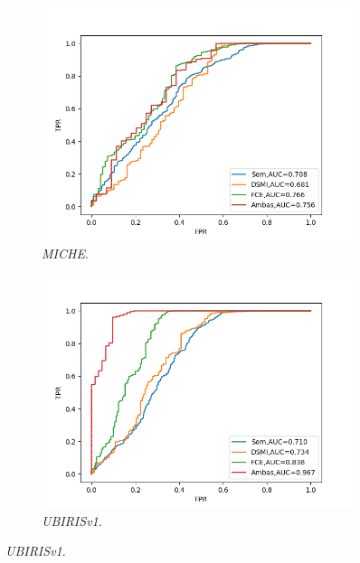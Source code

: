 \begin{figure}[h!]
    \centering %
\begin{subfigure}{0.35\textwidth}
  \includegraphics[width=\linewidth]{img/Resultados/miche_inter_nodistortion_auc.png}
  \caption{\textit{MICHE}.}
\end{subfigure}\hfil %
\begin{subfigure}{0.35\textwidth}
  \includegraphics[width=\linewidth]{img/Resultados/ubirisv1_inter_nodistortion_auc.png}
  \caption{\textit{UBIRISv1}.}
\end{subfigure}


\end{figure}
